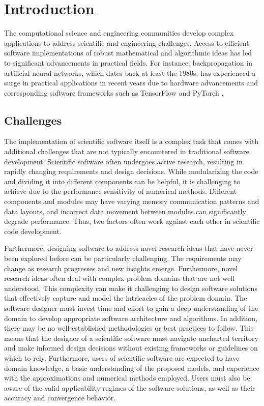 \section{Introduction}\label{chapter-04:section:introduction}

The computational science and engineering communities develop complex applications to address
scientific and engineering challenges.
Access to efficient software implementations of robust mathematical and algorithmic ideas has
led to significant advancements in practical fields.
For instance, backpropagation in artificial neural networks, which dates back at least the
1980s, has experienced a surge in practical applications in recent years due to hardware
advancements and corresponding software frameworks such as TensorFlow
\citep{martin_abadi_tensorflow_2015} and PyTorch \citep{paszke_pytorch_2019}.

\subsection*{Challenges}

The implementation of scientific software itself is a complex task that comes with additional
challenges that are not typically encountered in traditional software development.
Scientific software often undergoes active research, resulting in rapidly changing
requirements and design decisions.
While modularizing the code and dividing it into different components can be helpful, it is
challenging to achieve due to the performance sensitivity of numerical methods.
Different components and modules may have varying memory communication patterns and data layouts, 
and incorrect data movement between modules can significantly degrade performance.
Thus, two factors often work against each other in scientific code development.

Furthermore, designing software to address novel research ideas that have never been
explored before can be particularly challenging.
The requirements may change as research progresses and new insights emerge.
Furthermore, novel research ideas often deal with complex problem domains that are not well
understood.
This complexity can make it challenging to design software solutions that effectively capture
and model the intricacies of the problem domain.
The software designer must invest time and effort to gain a deep understanding of the
domain to develop appropriate software architecture and algorithms.
In addition, there may be no well-established methodologies or best practices to follow.
This means that the designer of a scientific software must navigate uncharted territory and make informed
design decisions without existing frameworks or guidelines on which to rely.
Furthermore, users of scientific software are expected to have domain knowledge, a basic
understanding of the proposed models, and experience with the approximations and numerical
methods employed.
Users must also be aware of the valid applicability regimes of the software solutions, as well
as their accuracy and convergence behavior.

